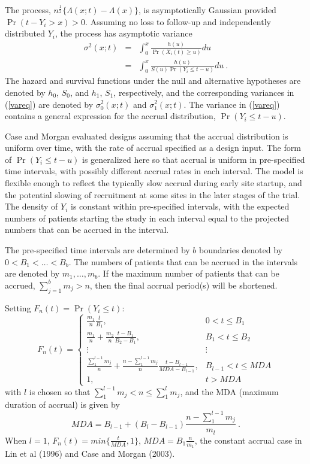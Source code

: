 \documentclass[12pt]{article}
\begin{document}
The process,
$n^{\frac{1}{2}}\{\hat\Lambda(x;t)-\Lambda(x)\}$, is asymptotically
Gaussian provided $\Pr(t-Y_i>x)>0$.  Assuming no loss to follow-up and independently distributed $Y_i$, the process has
asymptotic variance
\begin{eqnarray}
\sigma^2(x;t)&=&\int_0^x \frac{h(u)}{\Pr(X_i(t)\geq u)}du \nonumber \\
&=& \int_0^x \frac{h(u)}{S(u)\Pr(Y_i\leq t-u)}du \ . \label{vareq}
\end{eqnarray}
The hazard and survival functions under the null and alternative hypotheses are denoted by
$h_0$, $S_0$, and $h_1$, $S_1$, respectively, and the
corresponding variances in (\ref{vareq}) are denoted by $\sigma_0^2(x;t)$ and $\sigma_1^2(x;t)$.
The variance in (\ref{vareq}) contains a general expression for the accrual distribution,
$\Pr(Y_i\leq t-u)$.

Case and Morgan evaluated designs assuming that the accrual distribution is uniform over time, with
the rate of accrual specified as a design input.  The form of $\Pr(Y_i\leq t-u)$ is generalized here so
that accrual is uniform in pre-specified time intervals, with possibly different accrual rates in
each interval. The model is flexible enough to reflect the typically slow accrual during early site
startup, and the potential slowing of recruitment at some sites in the later stages of the trial.
The density of $Y_i$ is constant within pre-specified intervals, with the expected numbers of patients
starting the study in each interval equal to the projected numbers that can be accrued in the
interval.

The pre-specified time intervals are determined by $b$ boundaries denoted by $0<B_1<\ldots<B_b$.  The numbers of patients that can be accrued in the intervals are denoted by $m_1,\ldots,m_b$.
If the maximum number of patients that can be accrued, $\sum_{j=1}^b m_j>n$, then the
final accrual period(s) will be shortened.

    Setting $F_n(t)=\Pr(Y_i\leq t)$:
    $$F_n(t)=\left\{
    \begin{array}{ll}
    \frac{m_1}{n}\frac{t}{B_1}, & 0<t\leq B_1\\
    \frac{m_1}{n}+\frac{m_2}{n}\frac{t-B_1}{B_2-B_1}, & B_1<t\leq B_2\\
    \vdots & \vdots\\
    \frac{\sum_1^{l-1} m_j}{n}+\frac{n-\sum_1^{l-1} m_j}{n}\frac{t-B_{l-1}}{MDA-B_{l-1}}, &
    B_{l-1}<t\leq MDA\\
    1, & t>MDA
    \end{array}\right.$$
with $l$ is chosen so that $\sum_1^{l-1} m_j<n\leq \sum_1^l m_j$, and the MDA (maximum duration of
accrual) is given by
\begin{equation}
MDA=B_{l-1}+(B_l-B_{l-1})\frac{n-\sum_1^{l-1} m_j}{m_l} \ . \label{MDA}
\end{equation}
When $l=1$, $F_n(t)=min\{\frac{t}{MDA},1\}$, $MDA=B_1\frac{n}{m_1}$, the constant
accrual case in Lin et al (1996) and Case and Morgan (2003).
\end{document}
